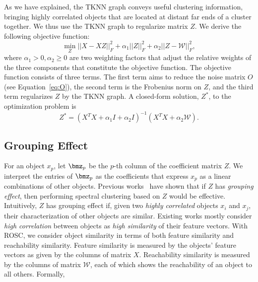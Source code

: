 As we have explained, the TKNN graph  conveys useful clustering information, bringing highly
correlated objects that are located at distant far ends of a cluster together.
We thus use the TKNN graph to regularize matrix $Z$.
We derive the following objective function:
\begin{equation}
\label{eq:obj_constraint}
\min_Z ||X-XZ||_F^2 + \alpha_1 ||Z||_F^2 + \alpha_2 ||Z-\mathcal{W}||_F^2,
\end{equation}
where $\alpha_1 > 0,\alpha_2 \geq 0$ are two 
weighting factors that adjust the relative weights of the three components that constitute
the objective function.
The objective function consists of three terms.
The first term aims to reduce the noise matrix $O$ (see Equation~\ref{eq:O}),
the second term is the Frobenius norm on $Z$, and
the third term regularizes $Z$ by the TKNN graph.
A closed-form solution, $Z^*$, to the optimization problem is
\begin{equation}
\label{eq:solution}
Z^* = (X^TX + \alpha_1I + \alpha_2I)^{-1}(X^TX+\alpha_2\mathcal{W}).
\end{equation}

\subsection*{Grouping Effect}
For an object $x_p$, 
let $\bmz_p$ be the $p$-th column of the coefficient matrix $Z$.
We interpret the entries of $\bmz_p$ as the coefficients that express $x_p$ as a linear combinations
of other objects. 
Previous works~\cite{lu2012robust,lu2013correlation,hu2014smooth} have shown that if $Z$ has {\it grouping effect}, then performing spectral 
clustering based on $Z$ would be effective. 
Intuitively, $Z$ has grouping effect if, given two {\it highly correlated} objects $x_i$ and $x_j$,
their characterization of other objects are similar.
Existing works mostly consider {\it high correlation} between objects as {\it high similarity} of their
feature vectors. With ROSC, we consider object similarity in terms of both feature similarity and 
reachability similarity. 
Feature similarity is measured by the objects' feature vectors as given by the columns of matrix $X$.
Reachability similarity is measured by the columns of matrix $\mathcal{W}$, 
each of which shows the reachability of an object to all others. 
Formally,



